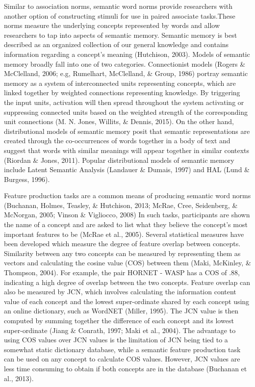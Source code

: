 \documentclass[english,man]{apa6}
\theoremstyle{definition}
\theoremstyle{definition}
\theoremstyle{remark}
\begin{document}
Similar to association norms, semantic word norms provide researchers
with another option of constructing stimuli for use in paired associate
tasks.These norms measure the underlying concepts represented by words
and allow researchers to tap into aspects of semantic memory. Semantic
memory is best described as an organized collection of our general
knowledge and contains information regarding a concept's meaning
(Hutchison, 2003). Models of semantic memory broadly fall into one of
two categories. Connectionist models (Rogers \& McClelland, 2006; e.g,
Rumelhart, McClelland, \& Group, 1986) portray semantic memory as a
system of interconnected units representing concepts, which are linked
together by weighted connections representing knowledge. By triggering
the input units, activation will then spread throughout the system
activating or suppressing connected units based on the weighted strength
of the corresponding unit connections (M. N. Jones, Willits, \& Dennis,
2015). On the other hand, distributional models of semantic memory posit
that semantic representations are created through the co-occurrences of
words together in a body of text and suggest that words with similar
meanings will appear together in similar contexts (Riordan \& Jones,
2011). Popular distributional models of semantic memory include Latent
Semantic Analysis (Landauer \& Dumais, 1997) and HAL (Lund \& Burgess,
1996).

Feature production tasks are a common means of producing semantic word
norms (Buchanan, Holmes, Teasley, \& Hutchison, 2013; McRae, Cree,
Seidenberg, \& McNorgan, 2005; Vinson \& Vigliocco, 2008) In such tasks,
participants are shown the name of a concept and are asked to list what
they believe the concept's most important features to be (McRae et al.,
2005). Several statistical measures have been developed which measure
the degree of feature overlap between concepts. Similarity between any
two concepts can be measured by representing them as vectors and
calculating the cosine value (COS) between them (Maki, McKinley, \&
Thompson, 2004). For example, the pair HORNET - WASP has a COS of .88,
indicating a high degree of overlap between the two concepts. Feature
overlap can also be measured by JCN, which involves calculating the
information content value of each concept and the lowest super-ordinate
shared by each concept using an online dictionary, such as WordNET
(Miller, 1995). The JCN value is then computed by summing together the
difference of each concept and its lowest super-ordinate (Jiang \&
Conrath, 1997; Maki et al., 2004). The advantage to using COS values
over JCN values is the limitation of JCN being tied to a somewhat static
dictionary database, while a semantic feature production task can be
used on any concept to calculate COS values. However, JCN values are
less time consuming to obtain if both concepts are in the database
(Buchanan et al., 2013).
\end{document}
